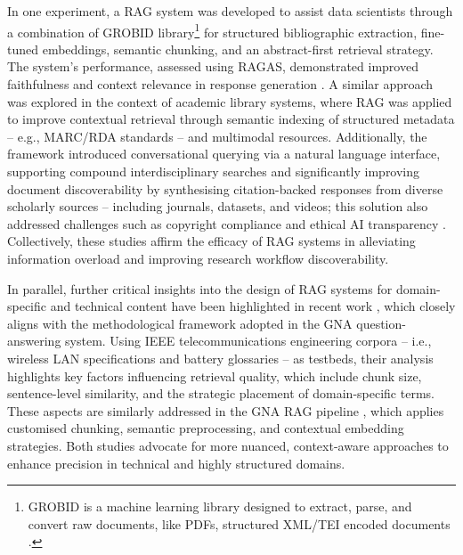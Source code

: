 \begin{spacing}{1.5}
In one experiment, a RAG system was developed to assist data scientists through a combination of GROBID library\footnote{GROBID is a machine learning library designed to extract, parse, and convert raw documents, like PDFs, structured XML/TEI encoded documents \citep{GROBID}.} for structured bibliographic extraction, fine-tuned embeddings, semantic chunking, and an abstract-first retrieval strategy. The system's performance, assessed using RAGAS, demonstrated improved faithfulness and context relevance in response generation \citep{aytar_retrieval-augmented_2024}. A similar approach was explored in the context of academic library systems, where RAG was applied to improve contextual retrieval through semantic indexing of structured metadata -- e.g., MARC/RDA standards -- and multimodal resources. Additionally, the framework introduced conversational querying via a natural language interface, supporting compound interdisciplinary searches and significantly improving document discoverability by synthesising citation-backed responses from diverse scholarly sources -- including journals, datasets, and videos; this solution also addressed challenges such as copyright compliance and ethical AI transparency \citep{bevara_prospects_2025}.  Collectively, these studies affirm the efficacy of RAG systems in alleviating information overload and improving research workflow discoverability.

In parallel, further critical insights into the design of RAG systems for domain-specific and technical content have been highlighted in recent work \citep{soman_observations_2024}, which closely aligns with the methodological framework adopted in the GNA question-answering system. Using IEEE telecommunications engineering corpora -- i.e., wireless LAN specifications and battery glossaries -- as testbeds, their analysis highlights key factors influencing retrieval quality, which include chunk size, sentence-level similarity, and the strategic placement of domain-specific terms. These aspects are similarly addressed in the GNA RAG pipeline \citep{pograri_question-answering_2025}, which applies customised chunking, semantic preprocessing, and contextual embedding strategies. Both studies advocate for more nuanced, context-aware approaches to enhance precision in technical and highly structured domains.


\end{spacing}
